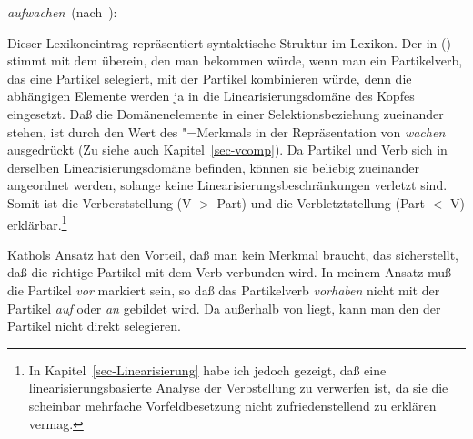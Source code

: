 \eas
\label{le-aufwachen-kathol}
\mbox{\emph{aufwachen} (nach \citet[]{Kathol95a}):}\\
\zs

\noindent
Dieser Lexikoneintrag repräsentiert syntaktische Struktur im Lexikon.
Der \domw in () stimmt mit dem \domw überein, den man bekommen würde,
wenn man ein Partikelverb, das eine Partikel selegiert, mit der Partikel kombinieren
würde, denn die abhängigen Elemente werden ja in die Linearisierungsdomäne
des Kopfes eingesetzt. Daß die Domänenelemente in einer Selektionsbeziehung zueinander stehen,
ist durch den Wert des \vcomp"=Merkmals in der Repräsentation von \emph{wachen} ausgedrückt
(Zu \vcomp siehe auch Kapitel~\ref{sec-vcomp}).
Da Partikel und Verb sich in derselben Linearisierungsdomäne befinden, können sie beliebig
zueinander angeordnet werden, solange keine Linearisierungsbeschränkungen verletzt sind. Somit
ist die Verberststellung (V $>$ Part) und die Verbletztstellung (Part $<$ V) erklärbar.\footnote{
  In Kapitel~\ref{sec-Linearisierung} habe ich jedoch gezeigt, daß eine linearisierungsbasierte
  Analyse der Verbstellung zu verwerfen ist, da sie die scheinbar mehrfache Vorfeldbesetzung nicht
  zufriedenstellend zu erklären vermag.%
}

Kathols Ansatz hat den Vorteil, daß man kein Merkmal braucht, das sicherstellt, daß
die richtige Partikel mit dem Verb verbunden wird. In meinem Ansatz muß die
Partikel \emph{vor} markiert sein, so daß das Partikelverb \emph{vorhaben} nicht mit der
Partikel \emph{auf} oder \emph{an} gebildet wird. Da \phon außerhalb von \synsem liegt,
kann man den \phonw der Partikel nicht direkt selegieren.

